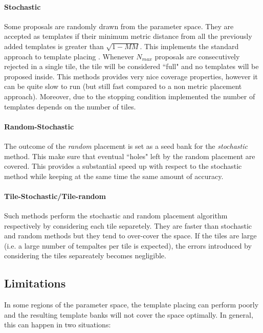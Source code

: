 \documentclass[twocolumn,showpacs,preprintnumbers,nofootinbib,prd,
superscriptaddress,10pt]{revtex4-1}
\begin{document}
\paragraph{Stochastic}\label{par:stochastic}
Some proposals are randomly drawn from the parameter space. They are accepted as templates if their minimum metric distance from all the previously added templates is greater than  $\sqrt{1-MM}$.
This implements the standard approach to template placing \cite{}.
Whenever $N_{max}$ proposals are consecutively rejected in a single tile, the tile will be considered ``full" and no templates will be proposed inside.
This methods provides very nice coverage properties, however it can be quite slow to run (but still fast compared to a non metric placement approach). Moreover, due to the stopping condition implemented the number of templates depends on the number of tiles.
\paragraph{Random-Stochastic}\label{par:randomstochastic}
The outcome of the {\it random} placement is set as a seed bank for the {\it stochastic} method. This make sure that eventual ``holes" left by the random placement are covered. This provides a substantial speed up with respect to the stochastic method while keeping at the same time the same amount of accuracy.
\paragraph{Tile-Stochastic/Tile-random}\label{par:tilerandom_stochastic}
Such methods perform the stochastic and random placement algorithm respectively by considering each tile separetely.
They are faster than stochastic and random methods but they tend to over-cover the space. If the tiles are large (i.e. a large number of tempaltes per tile is expected), the errors introduced by considering the tiles separeately becomes negligible.

\subsection{Limitations} \label{sec:limitations}

In some regions of the parameter space, the template placing can perform poorly and the resulting template banks will not cover the space optimally.
In general, this can happen in two situations:
\end{document}
